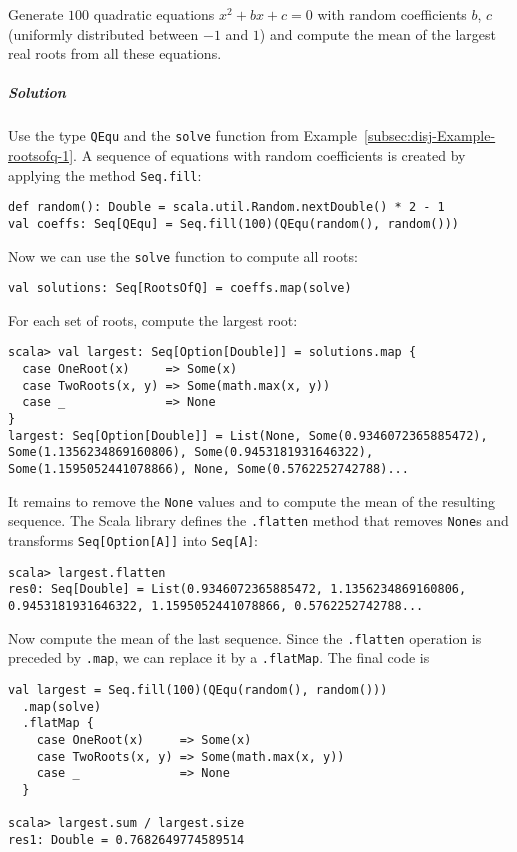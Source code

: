Generate $100$ quadratic equations $x^{2}+bx+c=0$ with random coefficients
$b$, $c$ (uniformly distributed between $-1$ and $1$) and compute
the mean of the largest real roots from all these equations.

\subparagraph{Solution}

Use the type \lstinline!QEqu! and the \lstinline!solve! function
from Example~\ref{subsec:disj-Example-rootsofq-1}. A sequence of
equations with random coefficients is created by applying the method
\lstinline!Seq.fill!:
\begin{lstlisting}
def random(): Double = scala.util.Random.nextDouble() * 2 - 1
val coeffs: Seq[QEqu] = Seq.fill(100)(QEqu(random(), random()))
\end{lstlisting}
Now we can use the \lstinline!solve! function to compute all roots:
\begin{lstlisting}
val solutions: Seq[RootsOfQ] = coeffs.map(solve)
\end{lstlisting}
For each set of roots, compute the largest root:
\begin{lstlisting}
scala> val largest: Seq[Option[Double]] = solutions.map {
  case OneRoot(x)     => Some(x)
  case TwoRoots(x, y) => Some(math.max(x, y))
  case _              => None
}
largest: Seq[Option[Double]] = List(None, Some(0.9346072365885472), Some(1.1356234869160806), Some(0.9453181931646322), Some(1.1595052441078866), None, Some(0.5762252742788)...
\end{lstlisting}
It remains to remove the \lstinline!None! values and to compute the
mean of the resulting sequence. The Scala library defines the \lstinline!.flatten!
method that removes \lstinline!None!s and transforms \lstinline!Seq[Option[A]]!
into \lstinline!Seq[A]!:
\begin{lstlisting}
scala> largest.flatten
res0: Seq[Double] = List(0.9346072365885472, 1.1356234869160806, 0.9453181931646322, 1.1595052441078866, 0.5762252742788...
\end{lstlisting}
Now compute the mean of the last sequence. Since the \lstinline!.flatten!
operation is preceded by \lstinline!.map!, we can replace it by a
\lstinline!.flatMap!. The final code is
\begin{lstlisting}
val largest = Seq.fill(100)(QEqu(random(), random()))
  .map(solve)
  .flatMap {
    case OneRoot(x)     => Some(x)
    case TwoRoots(x, y) => Some(math.max(x, y))
    case _              => None
  }

scala> largest.sum / largest.size
res1: Double = 0.7682649774589514
\end{lstlisting}


